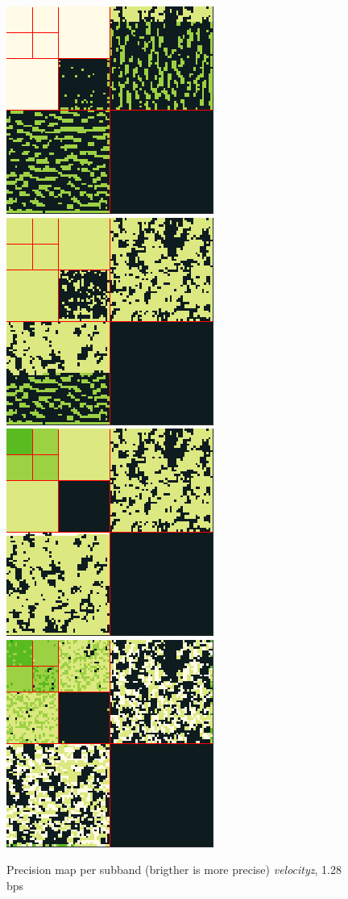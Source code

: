 \begin{figure}
	\centering
	{\includegraphics[width=0.48\linewidth]{img/laplacian/by-wavelet-norm.png}}
	{\includegraphics[width=0.48\linewidth]{img/laplacian/by-bit-plane.png}}
	{\includegraphics[width=0.48\linewidth]{img/laplacian/laplacian-signature.png}}
	{\includegraphics[width=0.48\linewidth]{img/laplacian/laplacian-optimized.png}}
	\caption{Precision map per subband (brigther is more precise) \emph{velocityz}, 1.28 bps}
	\label{fig:laplacian-precision-comparison}
\end{figure}

